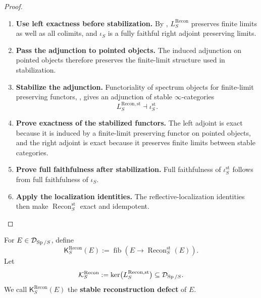 \begin{proof}
\leavevmode
\begin{enumerate}[label=\textup{(\arabic*)}]
    \item \textbf{Use left exactness before stabilization.}
    By ,
    \(L^{\mathrm{Recon}}_S\) preserves finite limits as well as all colimits, and
    \(\iota_S\) is a fully faithful right adjoint preserving limits.
    \item \textbf{Pass the adjunction to pointed objects.}
    The induced
    adjunction on pointed objects therefore preserves the finite-limit structure
    used in stabilization.
    \item \textbf{Stabilize the adjunction.}
    Functoriality of spectrum objects for finite-limit
    preserving functors,
    \cite[Section~1.4.2]{LurieHigherAlgebra}, gives an adjunction of stable
    \(\infty\)-categories
    \[
        L^{\mathrm{Recon},\mathrm{st}}_S
        \dashv
        \iota^{\mathrm{st}}_S.
    \]
    \item \textbf{Prove exactness of the stabilized functors.}
    The left adjoint is exact because it is induced by a finite-limit preserving
    functor on pointed objects, and the right adjoint is exact because it preserves
    finite limits between stable categories.
    \item \textbf{Prove full faithfulness after stabilization.}
    Full faithfulness of
    \(\iota^{\mathrm{st}}_S\) follows from full faithfulness of \(\iota_S\).
    \item \textbf{Apply the localization identities.}
    The reflective-localization identities then make
    \(\operatorname{Recon}^{\mathrm{st}}_S\) exact and idempotent.
\end{enumerate}
\end{proof}

\begin{definition}
\label{def:stable-reconstruction-defect}
For \(E\in\mathcal D_{\operatorname{Sp}/S}\), define
\[
    \mathsf K^{\mathrm{Recon}}_S(E)
    :=
    \operatorname{fib}
    \left(
        E
        \longrightarrow
        \operatorname{Recon}^{\mathrm{st}}_S(E)
    \right).
\]
Let
\[
    \mathcal K^{\mathrm{Recon}}_S
    :=
    \ker\bigl(L^{\mathrm{Recon},\mathrm{st}}_S\bigr)
    \subseteq
    \mathcal D_{\operatorname{Sp}/S}.
\]
We call \(\mathsf K^{\mathrm{Recon}}_S(E)\) the
\textbf{stable reconstruction defect} of \(E\).
\end{definition}

